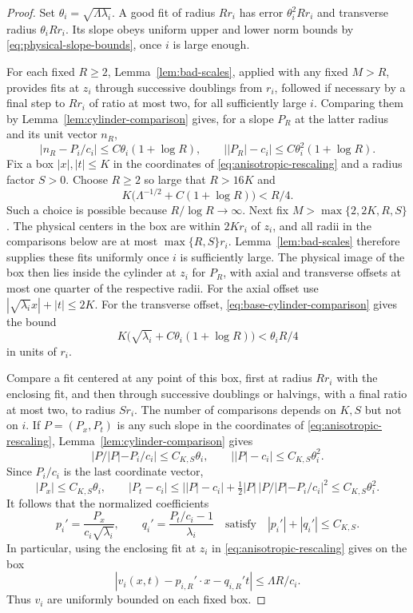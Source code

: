 \begin{proof}
Set $\theta_i=\sqrt{\Lambda\lambda_i}$. A good fit of radius $Rr_i$ has error $\theta_i^2Rr_i$ and transverse radius $\theta_i Rr_i$. Its slope obeys uniform upper and lower norm bounds by \eqref{eq:physical-slope-bounds}, once $i$ is large enough.

For each fixed $R\ge2$, Lemma~\ref{lem:bad-scales}, applied with any fixed $M>R$, provides fits at $z_i$ through successive doublings from $r_i$, followed if necessary by a final step to $Rr_i$ of ratio at most two, for all sufficiently large $i$. Comparing them by Lemma~\ref{lem:cylinder-comparison} gives, for a slope $P_R$ at the latter radius and its unit vector $n_R$,
\begin{equation}\label{eq:base-cylinder-comparison}
  |n_R-P_i/c_i|\le C\theta_i(1+\log R),\qquad
  \bigl||P_R|-c_i\bigr|\le C\theta_i^2(1+\log R).
\end{equation}
Fix a box $|x|,|t|\le K$ in the coordinates of \eqref{eq:anisotropic-rescaling} and a radius factor $S>0$. Choose $R\ge2$ so large that $R>16K$ and
\[
  K\bigl(\Lambda^{-1/2}+C(1+\log R)\bigr)<R/4.
\]
Such a choice is possible because $R/\log R\to\infty$. Next fix $M>\max\{2,2K,R,S\}$. The physical centers in the box are within $2Kr_i$ of $z_i$, and all radii in the comparisons below are at most $\max\{R,S\}r_i$. Lemma~\ref{lem:bad-scales} therefore supplies these fits uniformly once $i$ is sufficiently large. The physical image of the box then lies inside the cylinder at $z_i$ for $P_R$, with axial and transverse offsets at most one quarter of the respective radii. For the axial offset use $|\sqrt{\lambda_i}x|+|t|\le2K$. For the transverse offset, \eqref{eq:base-cylinder-comparison} gives the bound
\[
  K\bigl(\sqrt{\lambda_i}+C\theta_i(1+\log R)\bigr)<\theta_i R/4
\]
in units of $r_i$.

Compare a fit centered at any point of this box, first at radius $Rr_i$ with the enclosing fit, and then through successive doublings or halvings, with a final ratio at most two, to radius $Sr_i$. The number of comparisons depends on $K,S$ but not on $i$. If $P=(P_x,P_t)$ is any such slope in the coordinates of \eqref{eq:anisotropic-rescaling}, Lemma~\ref{lem:cylinder-comparison} gives
\[
  |P/|P|-P_i/c_i|\le C_{K,S}\theta_i,
  \qquad \bigl||P|-c_i\bigr|\le C_{K,S}\theta_i^2.
\]
Since $P_i/c_i$ is the last coordinate vector,
\[
  |P_x|\le C_{K,S}\theta_i,\qquad
  |P_t-c_i|\le\bigl||P|-c_i\bigr|
      +\tfrac12|P|\,|P/|P|-P_i/c_i|^2
      \le C_{K,S}\theta_i^2.
\]
It follows that the normalized coefficients
\begin{equation}\label{eq:normalized-fit-slopes}
  p_i'=\frac{P_x}{c_i\sqrt{\lambda_i}},\qquad
  q_i'=\frac{P_t/c_i-1}{\lambda_i}
  \quad\text{satisfy}\quad |p_i'|+|q_i'|\le C_{K,S}.
\end{equation}
In particular, using the enclosing fit at $z_i$ in \eqref{eq:anisotropic-rescaling} gives on the box
\[
  |v_i(x,t)-p_{i,R}'\cdot x-q_{i,R}'t|\le\Lambda R/c_i.
\]
Thus $v_i$ are uniformly bounded on each fixed box.


\end{proof}
